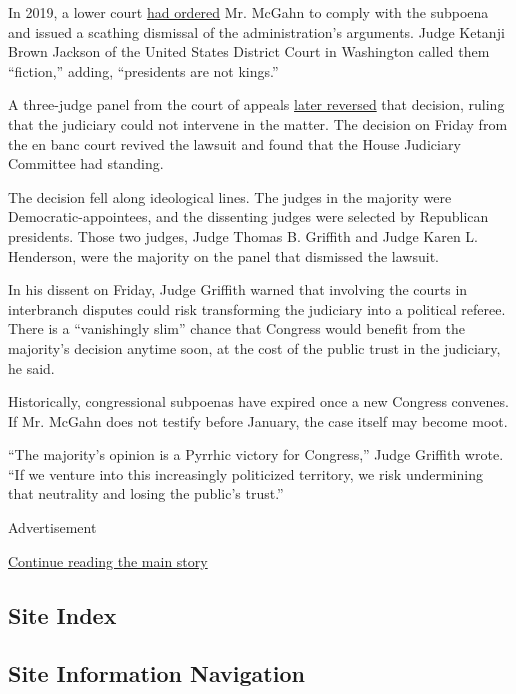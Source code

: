 In 2019, a lower court
\href{https://www.nytimes.com/2019/11/25/us/politics/mcgahn-testimony-ruling.html}{had
ordered} Mr. McGahn to comply with the subpoena and issued a scathing
dismissal of the administration's arguments. Judge Ketanji Brown Jackson
of the United States District Court in Washington called them
``fiction,'' adding, ``presidents are not kings.''

A three-judge panel from the court of appeals
\href{https://www.nytimes.com/2020/02/28/us/mcgahn-subpoena-trump.html}{later
reversed} that decision, ruling that the judiciary could not intervene
in the matter. The decision on Friday from the en banc court revived the
lawsuit and found that the House Judiciary Committee had standing.

The decision fell along ideological lines. The judges in the majority
were Democratic-appointees, and the dissenting judges were selected by
Republican presidents. Those two judges, Judge Thomas B. Griffith and
Judge Karen L. Henderson, were the majority on the panel that dismissed
the lawsuit.

In his dissent on Friday, Judge Griffith warned that involving the
courts in interbranch disputes could risk transforming the judiciary
into a political referee. There is a ``vanishingly slim'' chance that
Congress would benefit from the majority's decision anytime soon, at the
cost of the public trust in the judiciary, he said.

Historically, congressional subpoenas have expired once a new Congress
convenes. If Mr. McGahn does not testify before January, the case itself
may become moot.

``The majority's opinion is a Pyrrhic victory for Congress,'' Judge
Griffith wrote. ``If we venture into this increasingly politicized
territory, we risk undermining that neutrality and losing the public's
trust.''

Advertisement

\protect\hyperlink{after-bottom}{Continue reading the main story}

\hypertarget{site-index}{%
\subsection{Site Index}\label{site-index}}

\hypertarget{site-information-navigation}{%
\subsection{Site Information
Navigation}\label{site-information-navigation}}

